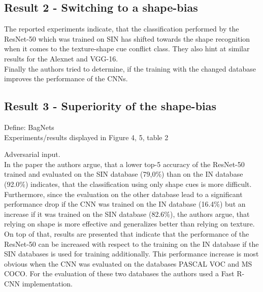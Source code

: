 \documentclass[runningheads,a4paper]{llncs}
\begin{document}
\subsection{Result 2 - Switching to a shape-bias}

The reported experiments indicate, that the classification performed by the ResNet-50 which was trained on SIN has shifted towards the shape recognition when it comes to the texture-shape cue conflict class. They also hint at similar results for the Alexnet and VGG-16.\\



Finally the authors tried to determine, if the training with the changed database improves the performance of the CNNs.

\subsection{Result 3 - Superiority of the shape-bias}
Define: BagNets\\
Experiments/results displayed in Figure 4, 5, table 2

Adversarial input.\\

In the paper the authors argue, that a lower top-5 accuracy of the ResNet-50 trained and evaluated on the SIN database (79,0\%) than on the IN database (92.0\%) indicates, that the classification using only shape cues is more difficult. %
Furthermore, since the evaluation on the other database lead to a significant performance drop if the CNN was trained on the IN database (16.4\%) but an increase if it was trained on the SIN database (82.6\%), the authors argue, that relying on shape is more effective and generalizes better than relying on texture.\\

On top of that, results are presented that indicate that the performance of the ResNet-50 can be increased with respect to the training on the IN database if the SIN databases is used for training additionally. This performance increase is most obvious when the CNN was evaluated on the databases PASCAL VOC and MS COCO. For the evaluation of these two databases the authors used a Fast R-CNN implementation.\\%
\end{document}
